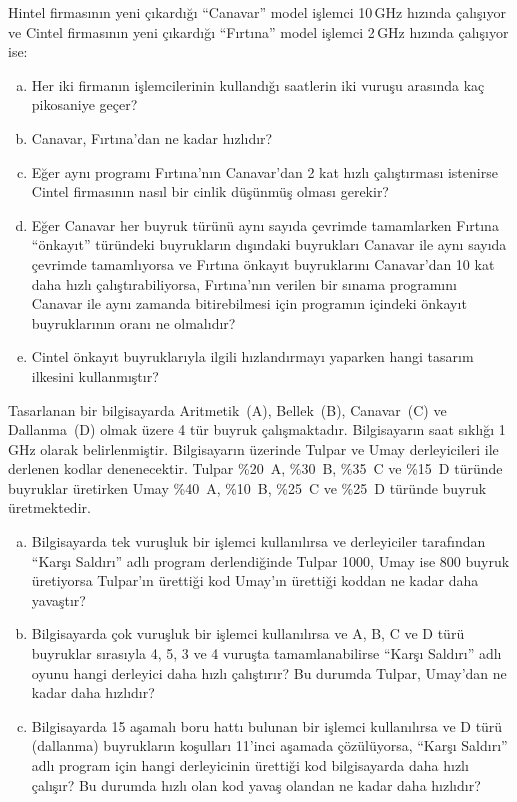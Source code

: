 \begin{alistirma}[\zor]
Hintel firmasının yeni çıkardığı ``Canavar'' model işlemci 10\,GHz hızında çalışıyor ve Cintel firmasının yeni çıkardığı ``Fırtına'' model işlemci 2\,GHz hızında çalışıyor ise:
\begin{enumerate}[(a)]
    \item Her iki firmanın işlemcilerinin kullandığı saatlerin iki vuruşu arasında kaç pikosaniye geçer?
    \item Canavar, Fırtına'dan ne kadar hızlıdır?
    \item Eğer aynı programı Fırtına'nın Canavar'dan 2 kat hızlı çalıştırması istenirse Cintel firmasının nasıl bir cinlik düşünmüş olması gerekir?
    \item Eğer Canavar her buyruk türünü aynı sayıda çevrimde tamamlarken Fırtına ``önkayıt'' türündeki buyrukların dışındaki buyrukları Canavar ile aynı sayıda çevrimde tamamlıyorsa ve Fırtına önkayıt buyruklarını Canavar'dan 10 kat daha hızlı çalıştırabiliyorsa, Fırtına'nın verilen bir sınama programını Canavar ile aynı zamanda bitirebilmesi için programın içindeki önkayıt buyruklarının oranı ne olmalıdır?
    \item Cintel önkayıt buyruklarıyla ilgili hızlandırmayı yaparken hangi tasarım ilkesini kullanmıştır?
\end{enumerate}
\end{alistirma}

\begin{alistirma}[\zor]
Tasarlanan bir bilgisayarda Aritmetik~(A), Bellek~(B), Canavar~(C) ve Dallanma~(D) olmak üzere 4 tür buyruk çalışmaktadır. Bilgisayarın saat sıklığı 1\,GHz olarak belirlenmiştir. Bilgisayarın üzerinde Tulpar ve Umay derleyicileri ile derlenen kodlar denenecektir. Tulpar \%20~A, \%30~B, \%35~C ve \%15~D türünde buyruklar üretirken Umay \%40~A, \%10~B, \%25~C ve \%25~D türünde buyruk üretmektedir.
\begin{enumerate}[(a)]
    \item Bilgisayarda tek vuruşluk bir işlemci kullanılırsa ve derleyiciler tarafından ``Karşı Saldırı'' adlı program derlendiğinde Tulpar 1000, Umay ise 800 buyruk üretiyorsa Tulpar'ın ürettiği kod Umay'ın ürettiği koddan ne kadar daha yavaştır?
    \item Bilgisayarda çok vuruşluk bir işlemci kullanılırsa ve A, B, C ve D türü buyruklar sırasıyla 4, 5, 3 ve 4 vuruşta tamamlanabilirse ``Karşı Saldırı'' adlı oyunu hangi derleyici daha hızlı çalıştırır? Bu durumda Tulpar, Umay'dan ne kadar daha hızlıdır?
    \item Bilgisayarda 15 aşamalı boru hattı bulunan bir işlemci kullanılırsa ve D türü (dallanma) buyrukların koşulları 11'inci aşamada çözülüyorsa, ``Karşı Saldırı'' adlı program için hangi derleyicinin ürettiği kod bilgisayarda daha hızlı çalışır? Bu durumda hızlı olan kod yavaş olandan ne kadar daha hızlıdır?
\end{enumerate}
\end{alistirma}

